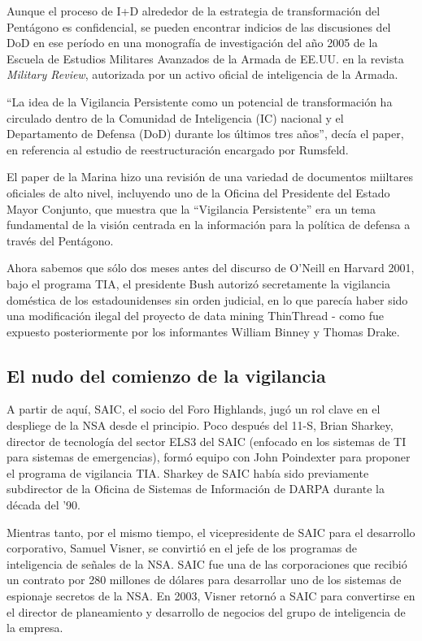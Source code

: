 \documentclass[10pt,a5paper,twoside,spanish,]{book}
\begin{document}
Aunque el proceso de I+D alrededor de la estrategia de transformación
del Pentágono es confidencial, se pueden encontrar indicios de las
discusiones del DoD en ese período en una monografía de investigación
del año 2005 de la Escuela de Estudios Militares Avanzados de la Armada
de EE.UU. en la revista \emph{Military Review}, autorizada por un activo
oficial de inteligencia de la Armada.

``La idea de la Vigilancia Persistente como un potencial de
transformación ha circulado dentro de la Comunidad de Inteligencia (IC)
nacional y el Departamento de Defensa (DoD) durante los últimos tres
años'', decía el paper, en referencia al estudio de reestructuración
encargado por Rumsfeld.

El paper de la Marina hizo una revisión de una variedad de documentos
miiltares oficiales de alto nivel, incluyendo uno de la Oficina del
Presidente del Estado Mayor Conjunto, que muestra que la ``Vigilancia
Persistente'' era un tema fundamental de la visión centrada en la
información para la política de defensa a través del Pentágono.

Ahora sabemos que sólo dos meses antes del discurso de O'Neill en
Harvard 2001, bajo el programa TIA, el presidente Bush autorizó
secretamente la vigilancia doméstica de los estadounidenses sin orden
judicial, en lo que parecía haber sido una modificación ilegal del
proyecto de data mining ThinThread - como fue expuesto posteriormente
por los informantes William Binney y Thomas Drake.

\subsection{El nudo del comienzo de la
vigilancia}\label{el-nudo-del-comienzo-de-la-vigilancia}

A partir de aquí, SAIC, el socio del Foro Highlands, jugó un rol clave
en el despliege de la NSA desde el principio. Poco después del 11-S,
Brian Sharkey, director de tecnología del sector ELS3 del SAIC (enfocado
en los sistemas de TI para sistemas de emergencias), formó equipo con
John Poindexter para proponer el programa de vigilancia TIA. Sharkey de
SAIC había sido previamente subdirector de la Oficina de Sistemas de
Información de DARPA durante la década del '90.

Mientras tanto, por el mismo tiempo, el vicepresidente de SAIC para el
desarrollo corporativo, Samuel Visner, se convirtió en el jefe de los
programas de inteligencia de señales de la NSA. SAIC fue una de las
corporaciones que recibió un contrato por 280 millones de dólares para
desarrollar uno de los sistemas de espionaje secretos de la NSA. En
2003, Visner retornó a SAIC para convertirse en el director de
planeamiento y desarrollo de negocios del grupo de inteligencia de la
empresa.
\end{document}
